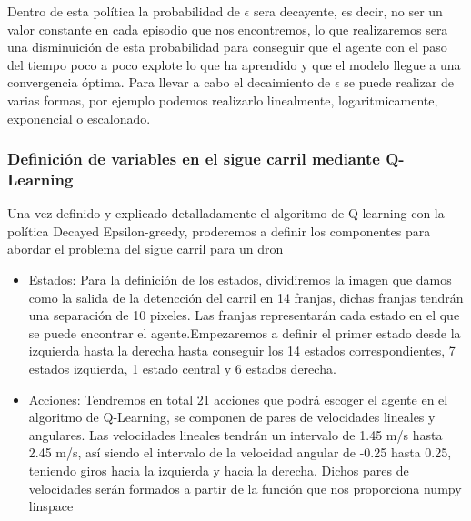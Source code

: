 Dentro de esta política la probabilidad de $\epsilon$ sera decayente, es decir, no ser un valor constante en cada episodio que nos encontremos, lo que realizaremos sera una disminuición 
de esta probabilidad para conseguir que el agente con el paso del tiempo poco a poco explote lo que ha aprendido y que el modelo llegue a una convergencia óptima. Para llevar a cabo el decaimiento
de $\epsilon$ se puede realizar de varias formas, por ejemplo podemos realizarlo linealmente, logaritmicamente, exponencial o escalonado. 

\subsubsection{Definición de variables en el sigue carril mediante Q-Learning}
\label{sec:QLearning}

Una vez definido y explicado detalladamente el algoritmo de Q-learning con la política Decayed Epsilon-greedy, proderemos a definir los componentes
para abordar el problema del sigue carril para un dron

\begin{itemize}
  \item Estados: Para la definición de los estados, dividiremos la imagen que damos como la salida de la detencción del carril en 14 franjas, dichas franjas tendrán una 
  separación de 10 pixeles. Las franjas representarán cada estado en el que se puede encontrar el agente.Empezaremos a definir el primer estado desde la izquierda hasta la derecha
  hasta conseguir los 14 estados correspondientes, 7 estados izquierda, 1 estado central y 6 estados derecha. 
  \item Acciones: Tendremos en total 21 acciones que podrá escoger el agente en el algoritmo de Q-Learning, se componen de pares de velocidades lineales y angulares. Las velocidades lineales
  tendrán un intervalo de 1.45 m/s hasta 2.45 m/s, así siendo el intervalo de la velocidad angular de -0.25 hasta 0.25, teniendo giros hacia la izquierda y hacia la derecha. Dichos pares
  de velocidades serán formados a partir de la función que nos proporciona numpy linspace  
  
\end{itemize}






  


  




  














        


  

